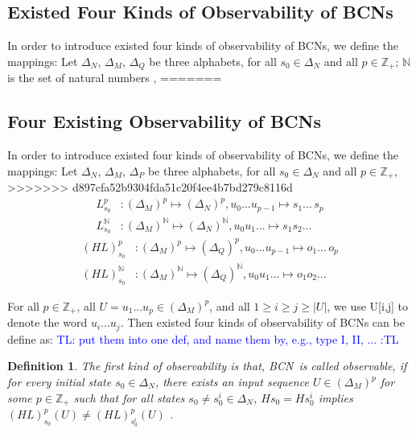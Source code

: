 \documentclass[conference]{IEEEtran} %
\newtheorem{definition}{Definition}
\def \BCN {{\em BCN}}
\newcommand{\tl}[1]{\textcolor{blue} {TL: #1 :TL} }
\begin{document}
\subsection{Existed Four Kinds of Observability of BCNs}
In order to introduce existed four kinds of observability of BCNs, we define the mappings: Let $\Delta_N$, $\Delta_M$, $\Delta_Q$ be three alphabets, for all $s_0\in \Delta_N$ and all $p\in \mathbb{Z}_+$; $\mathbb{N}$ is the set of natural numbers \cite{Zhang2016Observability},
=======

\subsection{Four Existing Observability of BCNs}
In order to introduce existed four kinds of observability of BCNs, we define the mappings: Let $\Delta_N$, $\Delta_M$, $\Delta_P$ be three alphabets, for all $s_0\in \Delta_N$ and all $p\in \mathbb{Z}_+$,
>>>>>>> d897cfa52b9304fda51c20f4ee4b7bd279c8116d
\begin{equation}
\begin{split}
L^p_{s_0} &: (\Delta_M)^p\mapsto(\Delta_N)^p, u_0 . . . u_{p-1} \mapsto s_1 . . .\, s_p\\
L^{\mathbb{N}}_{s_0} &: (\Delta_M)^{\mathbb{N}}\mapsto(\Delta_N)^{\mathbb{N}}, u_0 u_1 . . .  \mapsto s_1 s_2 . . .
\end{split}
\end{equation}
\begin{equation}
\begin{split}
(HL)^p_{s_0} &: (\Delta_M)^p\mapsto(\Delta_Q)^p, u_0 . . . u_{p-1} \mapsto o_1 . . .\, o_p\\
(HL)^{\mathbb{N}}_{s_0} &: (\Delta_M)^{\mathbb{N}}\mapsto(\Delta_Q)^{\mathbb{N}}, u_0 u_1 . . .  \mapsto o_1 o_2 . . .
\end{split}
\end{equation}

For all  $p\in \mathbb{Z}_+$, all $U=u_1 ... u_p \in(\Delta_M)^p$, and all $1\ge i \ge j \ge |U|$, we use U[i,j] to denote the word $u_i ... u_j$. Then existed four kinds of observability of BCNs can be define as: 
\tl{put them  into one def, and name them by, e.g., type I, II, ...}

\begin{definition}
The first kind of observability is that, \BCN\ is called observable, if for every initial state $s_0 \in \Delta_N$, there exists an input sequence $U\in(\Delta_M)^p$ for some $p\in \mathbb{Z}_+$ such that for all states $s_0\neq s^i_0\in \Delta_N$, $Hs_0=Hs^i_0$ implies $(HL)^p_{s_0}(U)\neq (HL)^p_{s^i_0}(U)$ \cite{cheng2009controllability}.
\end{definition}
\end{document}
